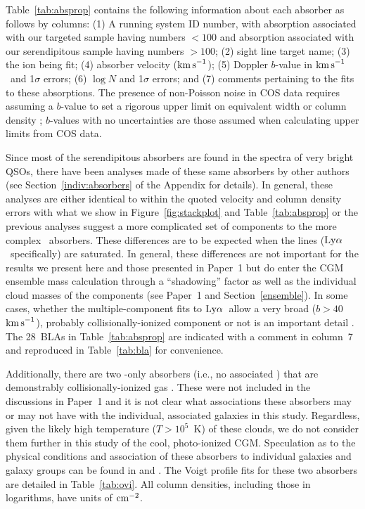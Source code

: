 \documentclass[twocolumn,twocolappendix,tighten,times]{aastex6}
\newcommand{\HI}{\ion{H}{1}}
\newcommand{\OVI}{\ion{O}{6}}
\newcommand{\kms}{\ensuremath{{\rm km\,s}^{-1}}}
\newcommand{\lya}{\ensuremath{{\rm Ly}\alpha}}
\begin{document}
Table~\ref{tab:absprop} contains the following information about each absorber 
as follows by columns: (1) A running system ID number, with absorption 
associated with our targeted sample having numbers $<100$ and absorption 
associated with our serendipitous sample having numbers $>100$; (2) sight 
line target name; (3) the ion being fit; (4) absorber velocity
(\kms); (5) Doppler $b$-value in \kms\ and 1$\sigma$ errors; (6) $\log{N}$
and 1$\sigma$ errors; and (7) comments pertaining to the fits to these 
absorptions. The presence of non-Poisson noise in COS data requires assuming 
a $b$-value to set a rigorous upper limit on equivalent width or column 
density \citep{keeney12}; $b$-values with no uncertainties are those assumed 
when calculating upper limits from COS data.

Since most of the serendipitous absorbers are found in the spectra
of very bright QSOs, there have been analyses made of these same
absorbers by other authors (see Section~\ref{indiv:absorbers} of the Appendix 
for details). In general, these analyses are either identical to within the quoted 
velocity and column density errors with what we show in Figure~\ref{fig:stackplot} 
and Table~\ref{tab:absprop} or the previous analyses suggest a more complicated 
set of components to the more complex \HI\ absorbers. These differences are to 
be expected when the lines (\lya\ specifically) are saturated. In general, 
these differences are not important for the results we present here and
those presented in Paper~1 but do enter the CGM ensemble mass calculation 
through a ``shadowing'' factor as well as the individual cloud masses of
the components (see Paper~1 and Section~\ref{ensemble}). 
In some cases, whether the multiple-component fits to \lya\ allow a very 
broad ($b > 40$~\kms), probably collisionally-ionized component 
\citep[a broad \lya\ absorber or BLA;][]{savage14} or not is an important detail 
\citep[see also][]{stocke14}. The 28~BLAs in Table~\ref{tab:absprop} are indicated
with a comment in column~7 and reproduced in Table~\ref{tab:bla} for 
convenience. 


\clearpage




Additionally, there are two \OVI-only absorbers (i.e., no 
associated \HI) that are demonstrably collisionally-ionized gas
\citep{savage10, savage14, stocke14}. These were not included in the
discussions in Paper~1 and it is not clear what associations these
absorbers may or may not have with the individual, associated galaxies
in this study. Regardless, given the likely high temperature ($T>10^5$~K) 
of these clouds, we do not consider them further in this study of the 
cool, photo-ionized CGM. Speculation as to the physical conditions and 
association of these absorbers to individual galaxies and galaxy groups 
can be found in \citet{savage14} and \citet{stocke14}. The Voigt profile 
fits for these two absorbers are detailed in Table~\ref{tab:ovi}. All 
column densities, including those in logarithms, have units of 
${\rm cm}^{-2}$.
\end{document}
